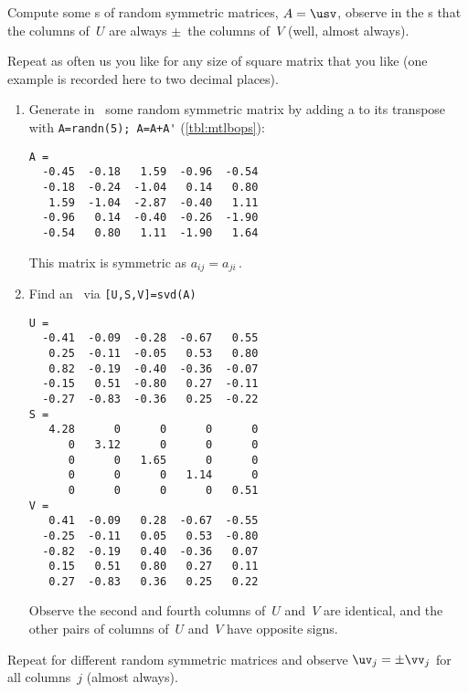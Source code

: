 \begin{example} \label{eg:symsigns}
Compute some \svd{}s of random symmetric matrices, \(A=\usv\), observe in the \svd{}s that the columns of~\(U\) are always \(\pm\)~the columns of~\(V\) (well, almost always).
\begin{solution} 
Repeat as often us you like for any size of square matrix that you like  (one example is recorded here to two decimal places).  
\begin{enumerate}
\item Generate in \script\ some random symmetric matrix by adding a 
 to its transpose with \verb|A=randn(5); A=A+A'| (\autoref{tbl:mtlbops}):
\setbox\ajrqrbox\hbox{}%
\marginpar{\usebox{\ajrqrbox\\[2ex]}}%
\begin{verbatim}
A =
  -0.45  -0.18   1.59  -0.96  -0.54
  -0.18  -0.24  -1.04   0.14   0.80
   1.59  -1.04  -2.87  -0.40   1.11
  -0.96   0.14  -0.40  -0.26  -1.90
  -0.54   0.80   1.11  -1.90   1.64
\end{verbatim}
This matrix is symmetric as \(a_{ij}=a_{ji}\)\,.
\item Find an \svd\ via \verb|[U,S,V]=svd(A)|
\begin{verbatim}
U =
  -0.41  -0.09  -0.28  -0.67   0.55
   0.25  -0.11  -0.05   0.53   0.80
   0.82  -0.19  -0.40  -0.36  -0.07
  -0.15   0.51  -0.80   0.27  -0.11
  -0.27  -0.83  -0.36   0.25  -0.22
S =
   4.28      0      0      0      0
      0   3.12      0      0      0
      0      0   1.65      0      0
      0      0      0   1.14      0
      0      0      0      0   0.51
V =
   0.41  -0.09   0.28  -0.67  -0.55
  -0.25  -0.11   0.05   0.53  -0.80
  -0.82  -0.19   0.40  -0.36   0.07
   0.15   0.51   0.80   0.27   0.11
   0.27  -0.83   0.36   0.25   0.22
\end{verbatim}
Observe the second and fourth columns of~\(U\) and~\(V\) are identical, and the other pairs of columns of~\(U\) and~\(V\) have opposite signs.
\end{enumerate}
Repeat for different random symmetric matrices and observe \(\uv_j=\pm \vv_j\) for all columns~\(j\) (almost always).
\end{solution}
\end{example}


